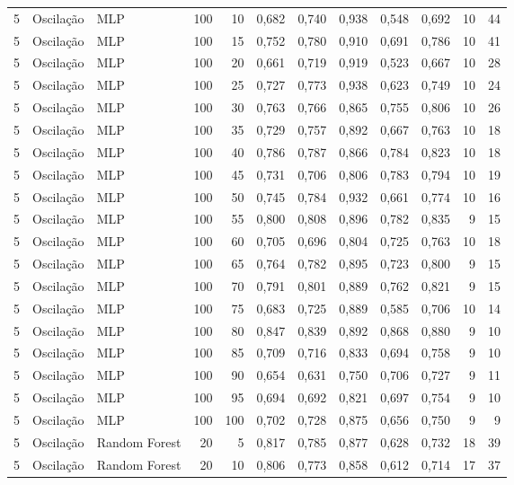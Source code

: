 \begin{longtable}{@{}rllrrrrrrrrr@{}}
5 & Oscilação & MLP & 100 & 10 & 0,682 & 0,740 & 0,938 & 0,548 & 0,692 & 10 & 44 \\
5 & Oscilação & MLP & 100 & 15 & 0,752 & 0,780 & 0,910 & 0,691 & 0,786 & 10 & 41 \\
5 & Oscilação & MLP & 100 & 20 & 0,661 & 0,719 & 0,919 & 0,523 & 0,667 & 10 & 28 \\
5 & Oscilação & MLP & 100 & 25 & 0,727 & 0,773 & 0,938 & 0,623 & 0,749 & 10 & 24 \\
5 & Oscilação & MLP & 100 & 30 & 0,763 & 0,766 & 0,865 & 0,755 & 0,806 & 10 & 26 \\
5 & Oscilação & MLP & 100 & 35 & 0,729 & 0,757 & 0,892 & 0,667 & 0,763 & 10 & 18 \\
5 & Oscilação & MLP & 100 & 40 & 0,786 & 0,787 & 0,866 & 0,784 & 0,823 & 10 & 18 \\
5 & Oscilação & MLP & 100 & 45 & 0,731 & 0,706 & 0,806 & 0,783 & 0,794 & 10 & 19 \\
5 & Oscilação & MLP & 100 & 50 & 0,745 & 0,784 & 0,932 & 0,661 & 0,774 & 10 & 16 \\
5 & Oscilação & MLP & 100 & 55 & 0,800 & 0,808 & 0,896 & 0,782 & 0,835 & 9 & 15 \\
5 & Oscilação & MLP & 100 & 60 & 0,705 & 0,696 & 0,804 & 0,725 & 0,763 & 10 & 18 \\
5 & Oscilação & MLP & 100 & 65 & 0,764 & 0,782 & 0,895 & 0,723 & 0,800 & 9 & 15 \\
5 & Oscilação & MLP & 100 & 70 & 0,791 & 0,801 & 0,889 & 0,762 & 0,821 & 9 & 15 \\
5 & Oscilação & MLP & 100 & 75 & 0,683 & 0,725 & 0,889 & 0,585 & 0,706 & 10 & 14 \\
5 & Oscilação & MLP & 100 & 80 & 0,847 & 0,839 & 0,892 & 0,868 & 0,880 & 9 & 10 \\
5 & Oscilação & MLP & 100 & 85 & 0,709 & 0,716 & 0,833 & 0,694 & 0,758 & 9 & 10 \\
5 & Oscilação & MLP & 100 & 90 & 0,654 & 0,631 & 0,750 & 0,706 & 0,727 & 9 & 11 \\
5 & Oscilação & MLP & 100 & 95 & 0,694 & 0,692 & 0,821 & 0,697 & 0,754 & 9 & 10 \\
5 & Oscilação & MLP & 100 & 100 & 0,702 & 0,728 & 0,875 & 0,656 & 0,750 & 9 & 9 \\
5 & Oscilação & Random Forest & 20 & 5 & 0,817 & 0,785 & 0,877 & 0,628 & 0,732 & 18 & 39 \\
5 & Oscilação & Random Forest & 20 & 10 & 0,806 & 0,773 & 0,858 & 0,612 & 0,714 & 17 & 37 \\

\end{longtable}
